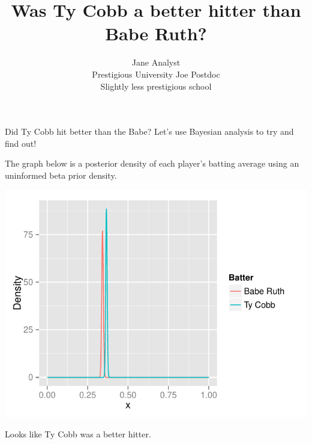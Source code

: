 \documentclass[article]{jss}
\author{
Jane Analyst\\Prestigious University \And Joe Postdoc\\Slightly less prestigious school
}
\title{Was Ty Cobb a better hitter than Babe Ruth?}
\begin{document}
Did Ty Cobb hit better than the Babe? Let's use Bayesian analysis to try
and find out!

The graph below is a posterior density of each player's batting average
using an uninformed beta prior density.

\begin{CodeChunk}


\begin{center}\includegraphics{Demo_files/figure-latex/unnamed-chunk-2-1} \end{center}

\end{CodeChunk}

Looks like Ty Cobb was a better hitter.
\end{document}

